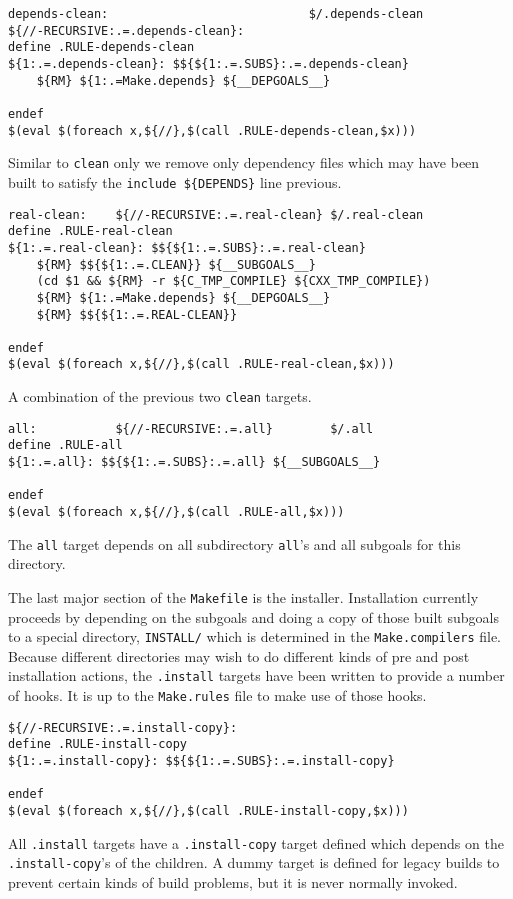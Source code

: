\documentclass[letterpaper]{article}
\begin{document}
\begin{verbatim}
depends-clean:                            $/.depends-clean
${//-RECURSIVE:.=.depends-clean}:
define .RULE-depends-clean
${1:.=.depends-clean}: $${${1:.=.SUBS}:.=.depends-clean}
	${RM} ${1:.=Make.depends} ${__DEPGOALS__}

endef
$(eval $(foreach x,${//},$(call .RULE-depends-clean,$x)))
\end{verbatim}
Similar to \verb+clean+ only we remove only dependency files which
may have been built to satisfy the \verb+include ${DEPENDS}+ line
previous.

\begin{verbatim}
real-clean:    ${//-RECURSIVE:.=.real-clean} $/.real-clean
define .RULE-real-clean
${1:.=.real-clean}: $${${1:.=.SUBS}:.=.real-clean}
	${RM} $${${1:.=.CLEAN}} ${__SUBGOALS__}
	(cd $1 && ${RM} -r ${C_TMP_COMPILE} ${CXX_TMP_COMPILE})
	${RM} ${1:.=Make.depends} ${__DEPGOALS__}
	${RM} $${${1:.=.REAL-CLEAN}}

endef
$(eval $(foreach x,${//},$(call .RULE-real-clean,$x)))
\end{verbatim}
A combination of the previous two \verb+clean+ targets.

\begin{verbatim}
all:           ${//-RECURSIVE:.=.all}        $/.all
define .RULE-all
${1:.=.all}: $${${1:.=.SUBS}:.=.all} ${__SUBGOALS__}

endef
$(eval $(foreach x,${//},$(call .RULE-all,$x)))
\end{verbatim}
The \verb+all+ target depends on all subdirectory \verb+all+'s
and all subgoals for this directory.


The last major section of the \verb+Makefile+ is the installer.
Installation currently proceeds by depending on the subgoals
and doing a copy of those built subgoals to a special directory,
\verb+INSTALL/+ which is determined in the \verb+Make.compilers+
file.  Because different directories may wish to do different
kinds of pre and post installation actions, the \verb+.install+
targets have been written to provide a number of hooks.  It is
up to the \verb+Make.rules+ file to make use of those hooks.

\begin{verbatim}
${//-RECURSIVE:.=.install-copy}:
define .RULE-install-copy
${1:.=.install-copy}: $${${1:.=.SUBS}:.=.install-copy}

endef
$(eval $(foreach x,${//},$(call .RULE-install-copy,$x)))
\end{verbatim}
All \verb+.install+ targets have a \verb+.install-copy+ target defined
which depends on the \verb+.install-copy+'s of the children.  A dummy
target is defined for legacy builds to prevent certain kinds of
build problems, but it is never normally invoked.
\end{document}
